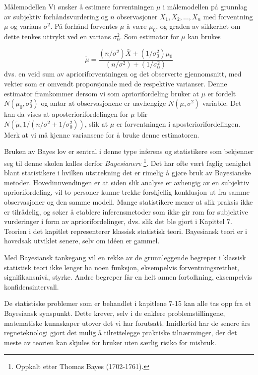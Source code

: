 {{\begin{eksempel}{Målemodellen}
Vi ønsker å estimere forventningen $\mu$ i målemodellen 
på grunnlag av subjektiv forhåndsvurdering og $n$ observasjoner
$X_1,X_2,\ldots, X_n$ med forventning $\mu$ og varians ${\sigma}^2$.
På forhånd forventes $\mu$ å være ${\mu}_0$, og graden
av sikkerhet om dette tenkes uttrykt ved en varians ${\sigma}_0^2$.
Som estimator for $\mu$ kan brukes

\[ \tilde{\mu}=\frac{(n/{\sigma}^2)\bar{X}+(1/{\sigma}_0^2){\mu}_0}
                 {(n/{\sigma}^2)+(1/{\sigma}_0^2)}  \]
dvs. en veid sum av aprioriforventningen og det observerte gjennomsnitt,
med vekter som er omvendt proporsjonale med de respektive varianser.
Denne estimator framkommer dersom vi som apriorifordeling bruker at
$\mu$ er fordelt $N({\mu}_0, {\sigma}_0^2)$ og antar at observasjonene
er uavhengige $N(\mu, {\sigma}^2)$ variable.  Det kan da vises at
aposteriorifordelingen for $\mu$ blir \\$N(\tilde{\mu}, 1/(n/{\sigma}^2 +
1/{\sigma}_0^2))$, slik at $\mu$ er forventningen i aposteriorifordelingen.
Merk at vi må kjenne variansene for å bruke denne estimatoren.
\end{eksempel}

Bruken av Bayes lov er sentral i denne type inferens og statistikere    
som bekjenner seg til denne skolen kalles derfor {\em Bayesianere}
\footnote{Oppkalt etter Thomas Bayes (1702-1761).}.  Det har ofte 
vært faglig uenighet blant statistikere i hvilken utstrekning det er
rimelig å gjøre bruk av Bayesianske metoder.  Hovedinnvendingen
er at siden slik analyse er avhengig av en subjektiv apriorifordeling,
vil to personer kunne trekke forskjellig konklusjon ut fra samme 
observasjoner og den samme modell.  Mange statistikere mener at slik
praksis ikke er tilrådelig, og søker å etablere inferensmetoder
som ikke gir rom for subjektive vurderinger i form av apriorifordelinger,
dvs. slik det ble gjort i Kapittel 7.  Teorien i det kapitlet
representerer klassisk statistisk teori.  Bayesiansk teori er i hovedsak
utviklet senere, selv om id\'{e}en er gammel.

Med Bayesiansk tankegang vil en rekke av de grunnleggende begreper
i klassisk statistisk teori ikke lenger ha noen funksjon, eksempelvis 
forventningsretthet, signifikansnivå, styrke.  Andre begreper får
en helt annen fortolkning, eksempelvis konfidensintervall.

De statistiske problemer som er behandlet i kapitlene 7-15 kan alle
tas opp fra et Bayesiansk synspunkt. Dette krever, selv i de
enklere problemstillingene, matematiske kunnskaper utover det vi har forutsatt.
Imidlertid har de senere års regneteknologi gjort det mulig å
tilrettelegge praktiske tilnærminger, der det meste av teorien kan skjules
for bruker uten særlig risiko for misbruk.	

}}
